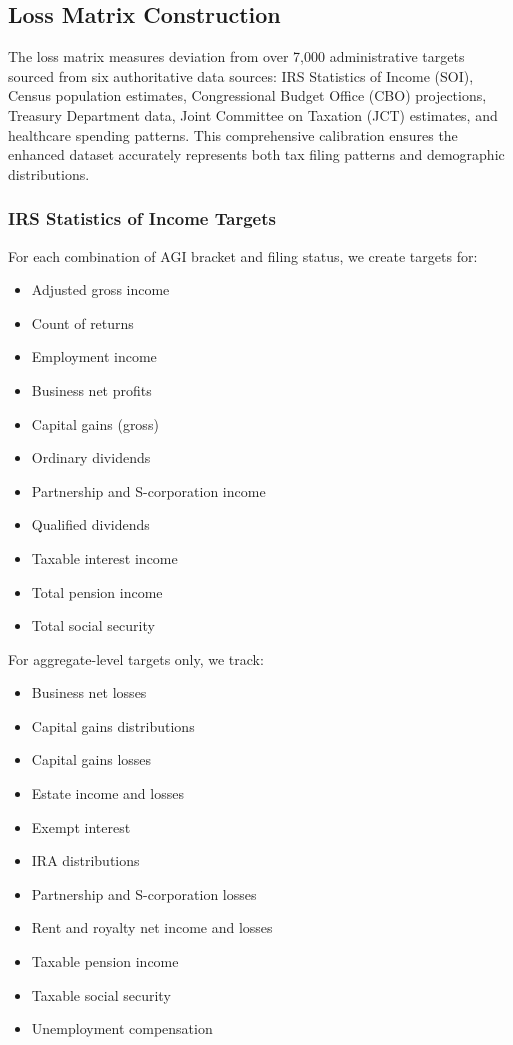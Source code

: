 \subsection{Loss Matrix Construction}

The loss matrix measures deviation from over 7,000 administrative targets sourced from six authoritative data sources: IRS Statistics of Income (SOI), Census population estimates, Congressional Budget Office (CBO) projections, Treasury Department data, Joint Committee on Taxation (JCT) estimates, and healthcare spending patterns. This comprehensive calibration ensures the enhanced dataset accurately represents both tax filing patterns and demographic distributions.

\subsubsection{IRS Statistics of Income Targets}

For each combination of AGI bracket and filing status, we create targets for:

\begin{itemize}
    \item Adjusted gross income
    \item Count of returns
    \item Employment income
    \item Business net profits
    \item Capital gains (gross)
    \item Ordinary dividends
    \item Partnership and S-corporation income
    \item Qualified dividends 
    \item Taxable interest income
    \item Total pension income
    \item Total social security
\end{itemize}

For aggregate-level targets only, we track:
\begin{itemize}
    \item Business net losses
    \item Capital gains distributions
    \item Capital gains losses
    \item Estate income and losses
    \item Exempt interest
    \item IRA distributions
    \item Partnership and S-corporation losses
    \item Rent and royalty net income and losses
    \item Taxable pension income
    \item Taxable social security
    \item Unemployment compensation
\end{itemize}

